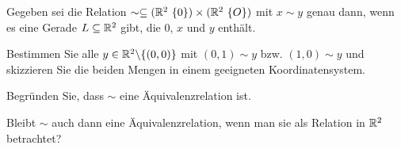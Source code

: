 \begin{Problem}
	Gegeben sei die Relation $\sim\subseteq (\mathbb{R}^2 \ \{0\}) \times  (\mathbb{R}^2 \ \{O\})$ mit $x\sim y$ genau dann, wenn es eine Gerade $L \subseteq \mathbb{R}^2$ gibt, die $0$, $x$ und $y$ enthält.

	\begin{parts}
		\item Bestimmen Sie alle $y \in \mathbb{R}^2 \backslash \{(0, 0)\}$ mit $(0, 1) \sim y$ bzw. $(1, 0) \sim y$ und skizzieren Sie die beiden Mengen in einem geeigneten Koordinatensystem.
		\item Begründen Sie, dass $\sim$ eine Äquivalenzrelation ist.
		\item Bleibt $\sim$ auch dann eine Äquivalenzrelation, wenn man sie als Relation in $\mathbb{R}^2$ betrachtet?
	\end{parts}
\end{Problem}
